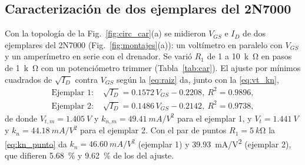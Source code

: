 \documentclass[conference]{IEEEtran}
\newcommand{\kn}{k_n}
\newcommand{\Vtm}{V_{t,m}}
\newcommand{\knm}{k_{n,m}}
\begin{document}
\subsection{Caracterización de dos ejemplares del 2N7000}
\label{sec:mont_car}
Con la topología de la Fig.~\ref{fig:circ_car}(a) se midieron $V_{GS}$ e $I_D$ de dos ejemplares del 2N7000 (Fig.~\ref{fig:montajes}(a)): un voltímetro en paralelo con $V_{GS}$ y un amperímetro en serie con el drenador. Se varió $R_1$ de 1 a \SI{10}{k\ohm} en pasos de \SI{1}{k\ohm} con un potenciómetro trimmer (Tabla~\ref{tab:car}). El ajuste por mínimos cuadrados de $\sqrt{I_D}$ contra $V_{GS}$ según la \eqref{eq:raiz} da, junto con la \eqref{eq:vt_kn},
\begin{equation}
\begin{aligned}
\text{Ejemplar 1: }&\sqrt{I_D}=0.1572\,V_{GS}-0.2208,\ R^2=0.9896,\\
\text{Ejemplar 2: }&\sqrt{I_D}=0.1486\,V_{GS}-0.2142,\ R^2=0.9738,
\end{aligned}
\label{eq:recta_m}
\end{equation}
de donde $\Vtm=\SI{1.405}{V}$ y $\knm=\SI{49.41}{mA/V^2}$ para el ejemplar 1, y $V_t=\SI{1.441}{V}$ y $\kn=\SI{44.18}{mA/V^2}$ para el ejemplar 2. Con el par de puntos $R_1=\SI{5}{k\ohm}$ la \eqref{eq:kn_punto} da $\kn=\SI{46.60}{mA/V^2}$ (ejemplar 1) y \SI{39.93}{mA/V^2} (ejemplar 2), que difieren \SI{5.68}{\percent} y \SI{9.62}{\percent} de los del ajuste.
\end{document}
